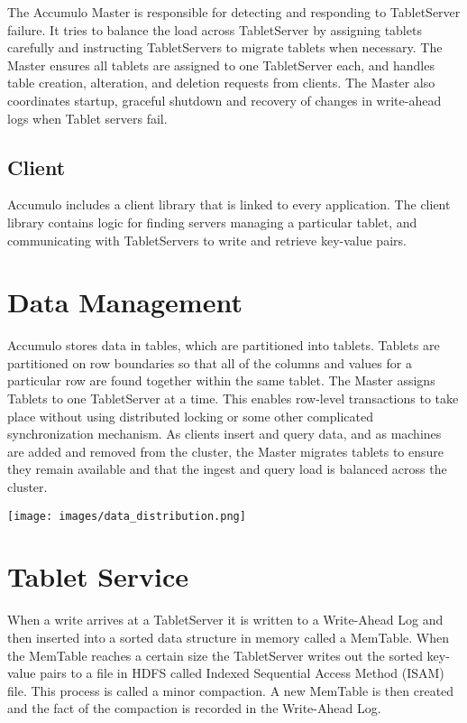 The Accumulo Master is responsible for detecting and responding to TabletServer
failure. It tries to balance the load across TabletServer by assigning tablets carefully
and instructing TabletServers to migrate tablets when necessary. The Master ensures all
tablets are assigned to one TabletServer each, and handles table creation, alteration,
and deletion requests from clients. The Master also coordinates startup, graceful
shutdown and recovery of changes in write-ahead logs when Tablet servers fail.

\subsection{Client}

Accumulo includes a client library that is linked to every application. The client
library contains logic for finding servers managing a particular tablet, and
communicating with TabletServers to write and retrieve key-value pairs.

\section{Data Management}

Accumulo stores data in tables, which are partitioned into tablets. Tablets are
partitioned on row boundaries so that all of the columns and values for a particular
row are found together within the same tablet. The Master assigns Tablets to one
TabletServer at a time. This enables row-level transactions to take place without
using distributed locking or some other complicated synchronization mechanism. As
clients insert and query data, and as machines are added and removed from the
cluster, the Master migrates tablets to ensure they remain available and that the
ingest and query load is balanced across the cluster.

\begin{center}
\texttt{[image: images/data\_distribution.png]}
\end{center}

\section{Tablet Service}


When a write arrives at a TabletServer it is written to a Write-Ahead Log and
then inserted into a sorted data structure in memory called a MemTable. When the
MemTable reaches a certain size the TabletServer writes out the sorted key-value
pairs to a file in HDFS called Indexed Sequential Access Method (ISAM)
file. This process is called a minor compaction.  A new MemTable is then created
and the fact of the compaction is recorded in the Write-Ahead Log.

